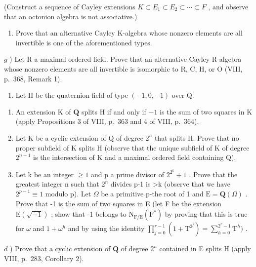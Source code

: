 (Construct a sequence of Cayley extensions \(K \subset E_{1} \subset E_{2} \subset \cdots \subset F\) , and observe that an octonion algebra is not associative.)

\begin{enumerate}
\def\labelenumi{\alph{enumi})}
\setcounter{enumi}{5}
\tightlist
\item
  Prove that an alternative Cayley K-algebra whose nonzero elements are all invertible is one of the aforementioned types.
\end{enumerate}

\(g\) ) Let R a maximal ordered field. Prove that an alternative Cayley R-algebra whose nonzero elements are all invertible is isomorphic to R, C, H, or O (VIII, p.~368, Remark 1).

\begin{enumerate}
\def\labelenumi{\arabic{enumi})}
\setcounter{enumi}{5}
\tightlist
\item
  Let H be the quaternion field of type \((-1,0,-1)\) over Q.
\end{enumerate}

\begin{enumerate}
\def\labelenumi{\alph{enumi})}
\item
  An extension \(\mathrm{K}\) of \(\mathbf{Q}\) splits \(\mathrm{H}\) if and only if \(-1\) is the sum of two squares in \(\mathrm{K}\) (apply Propositions 3 of VIII, p.~363 and 4 of VIII, p.~364).
\item
  Let K be a cyclic extension of Q of degree \(2^{n}\) that splits H. Prove that no proper subfield of K splits H (observe that the unique subfield of K of degree \(2^{n-1}\) is the intersection of K and a maximal ordered field containing Q).
\item
  Let k be an integer \(\geqslant1\) and p a prime divisor of \(2^{2^{k}}+1\) . Prove that the greatest integer n such that \(2^{n}\) divides p-1 is \textgreater k (observe that we have \(2^{p-1}\equiv1\) modulo p). Let \(\Omega\) be a primitive p-the root of 1 and \(\mathrm{E}=\mathbf{Q}(\Omega)\) . Prove that -1 is the sum of two squares in E (let F be the extension \(\mathrm{E}(\sqrt{-1})\) ; show that -1 belongs to \(\mathrm{N}_{\mathrm{F}/\mathrm{E}}(\mathrm{F}^{*})\) by proving that this is true for \(\omega\) and \(1+\omega^{h}\) and by using the identity \(\prod_{j=0}^{r-1}(1+\mathrm{T}^{2^{j}})=\sum_{h=0}^{2^{r}-1}\mathrm{T}^{h})\) .
\end{enumerate}

\(d\) ) Prove that a cyclic extension of \(\mathbf{Q}\) of degree \(2^{n}\) contained in E splits H (apply VIII, p.~283, Corollary 2).

